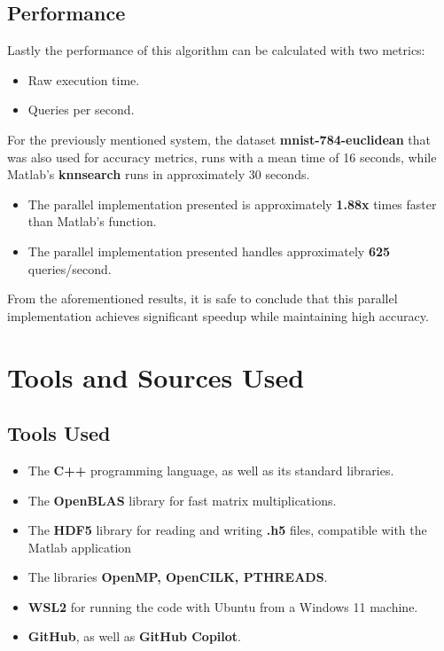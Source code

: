 \documentclass[12pt]{report}
\begin{document}
\section{Performance}
Lastly the performance of this algorithm can be calculated with two metrics:
\begin{itemize}
    \item Raw execution time.
    \item Queries per second.
\end{itemize}
For the previously mentioned system, the dataset \textbf{mnist-784-euclidean} that was also used for accuracy metrics, runs with a mean time of 16 seconds, while Matlab's \textbf{knnsearch} runs in approximately 30 seconds.
\begin{itemize}
    \item The parallel implementation presented is approximately \textbf{1.88x} times faster than Matlab's function.
    \item The parallel implementation presented handles approximately \textbf{625} queries/second.
\end{itemize}
From the aforementioned results, it is safe to conclude that this parallel implementation achieves significant speedup while maintaining high accuracy.

\chapter{Tools and Sources Used}
\section{Tools Used}
\begin{itemize}
    \item The \textbf{C++} programming language, as well as its standard libraries.
    \item The \textbf{OpenBLAS} library for fast matrix multiplications.
    \item The \textbf{HDF5} library for reading and writing \textbf{.h5} files, compatible with the Matlab application
    \item The libraries \textbf{OpenMP, OpenCILK, PTHREADS}.
    \item \textbf{WSL2} for running the code with Ubuntu from a Windows 11 machine.
    \item \textbf{GitHub}, as well as \textbf{GitHub Copilot}.
\end{itemize}
\end{document}
